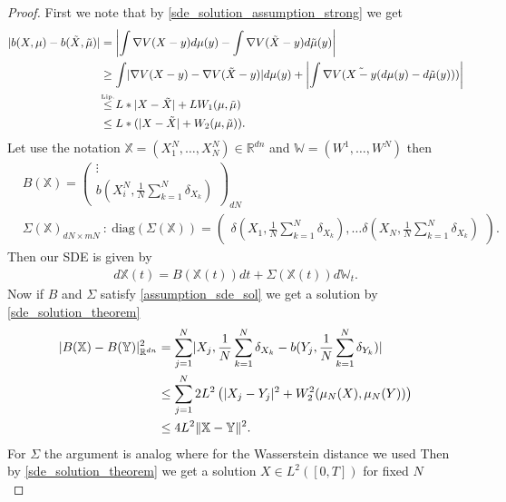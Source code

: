 \begin{proof} 
  First we note that by \autoref{sde_solution_assumption_strong} we get
  \begin{align*}
    \abs{b(X,\mu ) - b(\tilde{X},\tilde{\mu }  )} &= \abs*{\int \nabla V(X-y) d\mu(y) - \int  \nabla V(\tilde{X}-y ) d \tilde{\mu }(y) }\\
                                                  &\ge \int \abs{\nabla V(X-y) - \nabla V(\tilde{X}-y )}d\mu (y) + \abs*{\int \nabla V(\tilde{X - y}(d\mu(y) - d \tilde{\mu }(y) ) )}\\
                                                  &\myS{Lip.}{\le }L*\abs{X - \tilde{X} } + LW_1(\mu ,\tilde{\mu } ) \\
                                                  &\le L*(\abs{X-\tilde{X} } + W_2(\mu,\tilde{\mu } ))
  .\end{align*}
  Let use the notation $\mathbb{X} = (X_1^{N},\ldots ,X_N^{N}  ) \in  \mathbb{R}^{dn} $ and $\mathbb{W} = (W^{1},\ldots ,W^{N}  )$ then
  \begin{align*}
    &B(\mathbb{X}) = \begin{pmatrix} \vdots \\ b(X_i^{N},\frac{1}{N}\sum_{k=1}^{N}  \delta_{X_k} ) \end{pmatrix}_{dN} \\ 
    &\Sigma(\mathbb{X})_{dN \times mN} \ : \ \text{diag}(\Sigma(\mathbb{X})) = \begin{pmatrix} \delta(X_1,\frac{1}{N}\sum_{k=1}^{N} \delta_{X_k} ), \ldots \delta(X_N,\frac{1}{N}\sum_{k=1}^{N} \delta_{X_k} ) \end{pmatrix}
  .\end{align*}
  Then our SDE is given by 
  \begin{align*}
    d \mathbb{X}(t) = B(\mathbb{X}(t)) dt + \Sigma(\mathbb{X}(t)) d \mathbb{W}_t
  .\end{align*}
  Now if $B$ and $\Sigma $ satisfy \autoref{assumption_sde_sol} we get a solution by \autoref{sde_solution_theorem}
  \begin{align*}
    \lvert B(\mathbb{X})-B(\mathbb{Y})\rvert_{\mathbb{R}^{dn} }^2  &= \sum_{j=1}^{N} \lvert X_j,\frac{1}{N}\sum_{k=1}^{N} \delta_{X_k}  - b(Y_j,\frac{1}{N}\sum_{k=1}^{N} \delta_{Y_k} )\rvert  \\
                                                            &\le \sum_{j=1}^{N} 2L^2 \left( \lvert X_j-Y_j\rvert^2  + W_2^2(\mu_N(X),\mu_N(Y))\right)   \\
                                                            &\le  4L^2 \|\mathbb{X} - \mathbb{Y}\|^2 
  .\end{align*}
  For $\Sigma $ the argument is analog where for the Wasserstein distance we used 
  Then by \autoref{sde_solution_theorem} we get a solution $X \in  L^2([0,T])$ for fixed $N$\\[1ex]
\end{proof}
